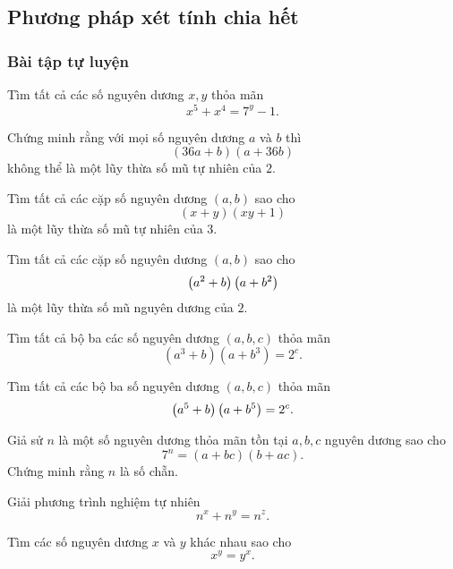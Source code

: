 \subsection{Phương pháp xét tính chia hết}

\subsubsection*{Bài tập tự luyện}

\begin{btt}
Tìm tất cả các số nguyên dương $x,y$ thỏa mãn $$x^5+x^4=7^y-1.$$
\end{btt}

\begin{btt}
Chứng minh rằng với mọi số nguyên dương $a$ và $b$ thì $$(36a+b)(a+36b)$$ không thể là một lũy thừa số mũ tự nhiên của $2.$
\end{btt}

\begin{btt}
Tìm tất cả các cặp số nguyên dương $(a,b)$ sao cho $$(x+y)(xy+1)$$ là một lũy thừa số mũ tự nhiên của $3$.
\end{btt}

\begin{btt}
Tìm tất cả các cặp số nguyên dương $(a,b)$ sao cho $$\left(\displaystyle a^2+b \right)\left(\displaystyle a+b^2 \right)$$ là một lũy thừa số mũ nguyên dương của $2.$
\end{btt}

\begin{btt}
Tìm tất cả bộ ba các số nguyên dương $(a,b,c)$ thỏa mãn $$\left(a^3+b\right)\left(a+b^3\right)=2^c.$$
\end{btt}

\begin{btt}
Tìm tất cả các bộ ba số nguyên dương $(a,b,c)$ thỏa mãn \[\left(\displaystyle a^5+b \right)\left(\displaystyle a+b^5 \right)=2^c.\]
\end{btt}

\begin{btt}
Giả sử $n$ là một số nguyên dương thỏa mãn tồn tại $a, b, c$ nguyên dương sao cho 
$$7^{n}=(a+b c)(b+a c).$$ 
Chứng minh rằng $n$ là số chẵn.
\end{btt}

\begin{btt}
Giải phương trình nghiệm tự nhiên \[n^x+n^y=n^z.\]
\end{btt}

\begin{btt}
Tìm các số nguyên dương $x$ và $y$ khác nhau sao cho
\[x^y=y^x.\]
\end{btt}

